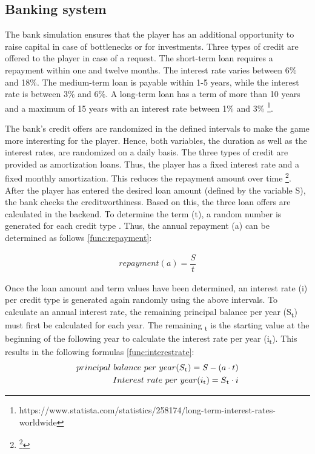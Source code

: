 \subsection{Banking system}
\label{sec: banking}

The bank simulation ensures that the player has an additional opportunity to raise capital in case of bottlenecks or for investments. Three types of credit are offered to the player in case of a request. 
The short-term loan requires a repayment within one and twelve months. The interest rate varies between 6\% and 18\%. The medium-term loan is payable within 1-5 years, while the interest rate is between 3\% and 6\%. A long-term loan has a term of more than 10 years and a maximum of 15 years with an interest rate between 1\% and 3\% \footnote{https://www.statista.com/statistics/258174/long-term-interest-rates-worldwide}. 

The bank's credit offers are randomized in the defined intervals to make the game more interesting for the player. Hence, both variables, the duration as well as the interest rates, are randomized on a daily basis. The three types of credit are provided as amortization loans. Thus, the player has a fixed interest rate and a fixed monthly amortization. This reduces the repayment amount over time \footnote{\footnote{https://www.investopedia.com/terms/a/amortized\_loan.asp}}.
After the player has entered the desired loan amount (defined by the variable S), the bank checks the creditworthiness. Based on this, the three loan offers are calculated in the backend. To determine the term (t), a random number is generated for each credit type . Thus, the annual repayment (a) can be determined as follows \ref{func:repayment}:

\begin{equation}
\label{func:repayment}
\begin{aligned}
repayment (a)= {\dfrac{S}{t}}
\end{aligned}    
\end{equation}

Once the loan amount and term values have been determined, an interest rate (i) per credit type is generated again randomly using the above intervals. To calculate an annual interest rate, the remaining principal balance per year (S\textsubscript{t}) must first be calculated for each year. The remaining \textsubscript{t}  is the starting value at the beginning of the following year to calculate the interest rate per year (i\textsubscript{t}). This results in the following formulas \ref{func:interestrate}:
\begin{equation}
\label{func:interestrate}
\begin{aligned}
principal \ balance \ per \ year (S\textsubscript{t})= S- (a \cdot t)\\
Interest \ rate \ per \ year (i\textsubscript{t}) = S\textsubscript{t} \cdot i
\end{aligned}    
\end{equation}

